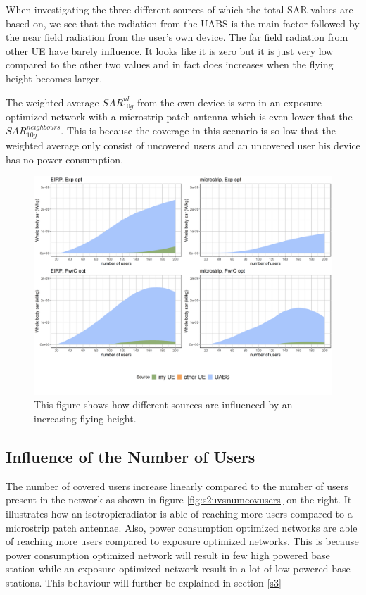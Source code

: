 When investigating the three different sources of which the total \gls{SAR}-values are based on, we see 
that the radiation from the \gls{UABS} is the main factor followed by the near field radiation from the user's own device.
The far field radiation from other \gls{UE} have barely influence. 
It looks like it is zero but it is just very low compared to the other two values and in fact does increases when the flying height becomes larger.

The weighted average $SAR^{ul}_{10g}$ from the own device is zero in an exposure optimized network with a microstrip patch antenna which is even lower that the $SAR^{neighbours}_{10g}$.
This is because the coverage in this scenario is so low that the weighted average only consist of uncovered users and an uncovered user his device has no power consumption.
\begin{figure}[]
  \includegraphics[width=\textwidth]{../results/s2/fhFourSources.png}
  \caption{This figure shows how different sources are influenced by an increasing flying height.}
  \label{fig:s2shfourSourcesMatrix}
\end{figure}

\FloatBarrier
\subsection{Influence of the Number of Users}
\label{s2b}

The number of covered users increase linearly compared to the number of users present in the network as shown in figure 
\ref{fig:s2uvsnumcovusers} on the right. It illustrates how an \gls{isotropicradiator} is able of reaching more users 
compared to a microstrip patch antennae.
Also, power consumption optimized networks are able of reaching more users compared to exposure optimized networks.
This is because power consumption optimized network will result in few high powered base station while an 
exposure optimized network result in a lot of low powered base stations. This behaviour will further be explained in section \ref{s3}

